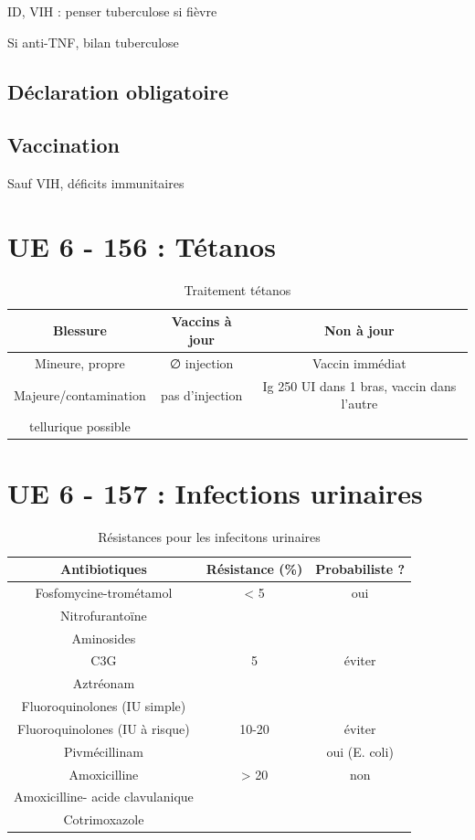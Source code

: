 ID, VIH : penser tuberculose si fièvre

Si anti-TNF, bilan tuberculose
\subsection{Déclaration obligatoire}

\subsection{Vaccination}
Sauf VIH, déficits immunitaires

\section{UE 6 - 156 : Tétanos}
\begin{table}[htpb]
  \centering
  \caption{Traitement tétanos}
  \begin{tabular}{ccc}
    \toprule
    Blessure& Vaccins à jour& Non à jour\\
    \midrule
    Mineure, propre& ∅ injection& Vaccin immédiat\\
    Majeure/contamination& pas d'injection& Ig 250 UI dans 1
    bras, vaccin dans l'autre\\
    tellurique possible&&\\
    \bottomrule
  \end{tabular}
\end{table}

\section{UE 6 - 157 : Infections urinaires}%
\label{sec:item_157_infections_urinaires}

\begin{table}[htpb]
  \centering
  \caption{Résistances pour les infecitons urinaires}
  \begin{tabular}{ccc}
    \toprule
    Antibiotiques & Résistance (\%) & Probabiliste ? \\
    \midrule
    Fosfomycine-trométamol & < 5 & oui \\
    Nitrofurantoïne & &\\
    Aminosides & &\\
    \midrule
    C3G & 5 & éviter \\
    Aztréonam&&\\
    Fluoroquinolones (IU simple)&&\\
    \midrule
    Fluoroquinolones (IU à risque)& 10-20& éviter\\
    Pivmécillinam & & oui (E. coli) \\
    \midrule
    Amoxicilline & > 20 & non\\
    Amoxicilline- acide clavulanique &\\
    Cotrimoxazole &\\
    \bottomrule
  \end{tabular}
\end{table}

